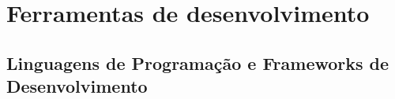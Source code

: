 \chapter{Ferramentas de desenvolvimento}
\section{Linguagens de Programação e Frameworks de Desenvolvimento}